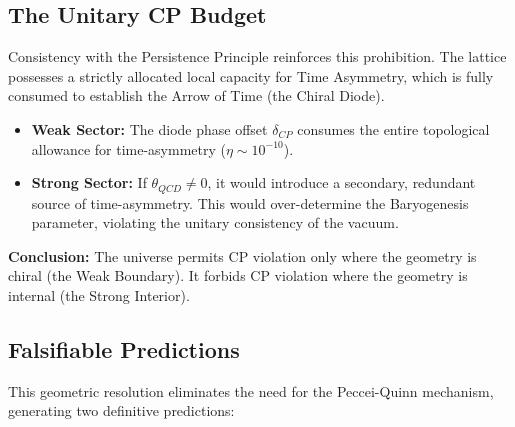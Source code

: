 \subsection{The Unitary CP Budget}
Consistency with the Persistence Principle reinforces this prohibition. The lattice possesses a strictly allocated local capacity for Time Asymmetry, which is fully consumed to establish the Arrow of Time (the Chiral Diode).

\begin{itemize}
    \item \textbf{Weak Sector:} The diode phase offset $\delta_{CP}$ consumes the entire topological allowance for time-asymmetry ($\eta \sim 10^{-10}$).
    \item \textbf{Strong Sector:} If $\theta_{QCD} \neq 0$, it would introduce a secondary, redundant source of time-asymmetry. This would over-determine the Baryogenesis parameter, violating the unitary consistency of the vacuum.
\end{itemize}

\textbf{Conclusion:} The universe permits CP violation only where the geometry is chiral (the Weak Boundary). It forbids CP violation where the geometry is internal (the Strong Interior).

\subsection{Falsifiable Predictions}
This geometric resolution eliminates the need for the Peccei-Quinn mechanism, generating two definitive predictions:

